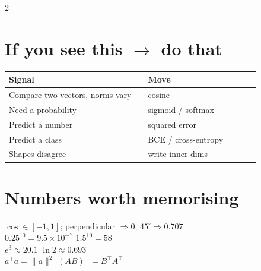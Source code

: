 \documentclass[11pt,a4paper]{article}
\newcommand{\sect}[1]{\section*{#1}}
\begin{document}
\begin{multicols}{2}
\sect{If you see this $\rightarrow$ do that}
\begin{tabular}{@{}p{0.52\linewidth}p{0.42\linewidth}@{}}
\toprule
Signal & Move\\
\midrule
Compare two vectors, norms vary & cosine\\
Need a probability & sigmoid / softmax\\
Predict a number & squared error\\
Predict a class & BCE / cross-entropy\\
Shapes disagree & write inner dims\\
\bottomrule
\end{tabular}


\sect{Numbers worth memorising}
$\cos\in[-1,1]$; perpendicular $\Rightarrow 0$; $45^\circ\Rightarrow0.707$\\
$0.25^{10}=9.5\times10^{-7}$ \quad $1.5^{10}=58$\\
$e^{3}\approx20.1$ \quad $\ln 2\approx0.693$\\
$a^\top a=\|a\|^2$ \quad $(AB)^\top=B^\top A^\top$

\end{multicols}
\end{document}
